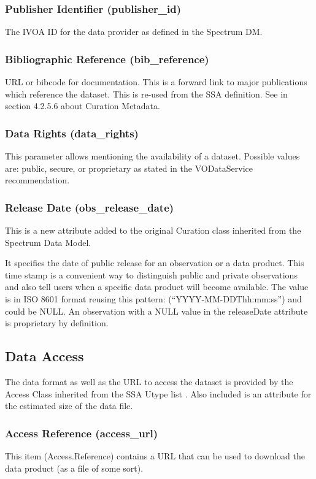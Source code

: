 \documentclass[11pt,a4paper]{ivoa}
\begin{document}
\subsubsection{Publisher Identifier (publisher\_id)}
The IVOA ID for the data provider as defined in the Spectrum DM.

\subsubsection{Bibliographic Reference (bib\_reference)}
URL or bibcode for documentation. This is a forward link to major publications which reference the dataset.  This is
re-used from the SSA definition. See \citep{2012ivoa.spec.0210T}  in section 4.2.5.6 about Curation Metadata.

\subsubsection{Data Rights (data\_rights)}
This parameter allows mentioning the availability of a dataset.  Possible values are: public, secure, or proprietary as
stated in the VODataService recommendation\citep{2010ivoa.spec.1202P}.

\subsubsection{Release Date (obs\_release\_date)}
This is a new attribute added to the original Curation class inherited from the Spectrum Data Model.

It specifies the date of public release for an observation or a data product. This time stamp is a convenient way to
distinguish public and private observations and also tell users when a specific data product will become available. The
value is in ISO 8601 format reusing this pattern: (``YYYY-MM-DDThh:mm:ss{}'') and could be NULL. An observation with a
NULL value in the releaseDate attribute is proprietary by definition.

\subsection{Data Access}
The data format as well as the URL to access the dataset is provided by the Access Class inherited from the SSA Utype
list \citep{2012ivoa.spec.0210T}. Also included is an attribute for the estimated size of the data file.

\subsubsection{Access Reference (access\_url)}
This item (Access.Reference) contains a URL that can be used to download the data product (as a file of some sort).
\end{document}
